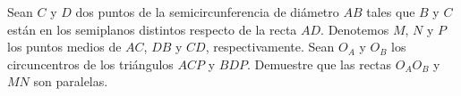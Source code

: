 Sean $C$ y $D$ dos puntos de la semicircunferencia de diámetro $AB$ tales que $B$ y $C$ están en los semiplanos distintos respecto de la recta $AD$. Denotemos $M$, $N$ y $P$ los puntos medios de $AC$, $DB$ y $CD$, respectivamente. Sean $O_A$ y $O_B$ los circuncentros de los triángulos $ACP$ y $BDP$. Demuestre que las rectas $O_A O_B$ y $MN$ son paralelas.
